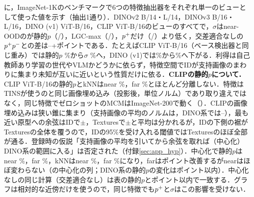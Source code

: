 に，ImageNet-1Kのベンチマークで6つの特徴抽出器をそれぞれ単一のビューとして使った値を示す（抽出1通り）．DINOv2 B/14・L/14，DINOv3 B/16・L/16，DINO (v1) ViT-B/16，CLIP ViT-B/16の\NViewsN{}ビューのすべてで，$\sigma$はnear-OODの\FPR{}が静的$p$（\NViewsNMainBelowStaticNear{}/\NViewsN{}），LGC-max（\NViewsNMainBelowLgcNear{}/\NViewsN{}），$p^{+}$だけ（\NViewsNMainBelowLpNear{}/\NViewsN{}）より低く，交差適合なしの$p^{+}p^{-}$との差は\NViewsMinMainMinusVOneNear{}--+\NViewsMaxMainMinusVOneNear{}ポイントである．たとえばCLIP ViT-B/16（ベース検出器と同じ重み）では静的$p$ \NViewClipStaticNearFpr\%から$\sigma$ \NViewClipMainNearFpr\%へ，DINO (v1)では\NViewDinoOneStaticNearFpr\%から\NViewDinoOneMainNearFpr\%へ下がる．利得は自己教師あり学習の世代やVLMかどうかに依らず，特徴空間でIDが支持画像のまわりに集まり未知が互いに近いという性質だけに依る．\textbf{CLIPの静的$p$について．}CLIP ViT-B/16の静的$p$とkNNはnear \NViewClipStaticNearFpr\%，far \NViewClipStaticFarFpr\%とほとんど分離しない．特徴はTINSが使うのと同じ画像埋め込み（投影後，単位ノルム）であり取り違えではなく，同じ特徴でゼロショットのMCMはImageNet-200で動く（）．CLIPの画像埋め込みは狭い錐に集まり（支持画像の平均のノルムは\NViewsSupportMeanNormClip{}，DINO系では\NViewsSupportMeanNormDinoMin{}--\NViewsSupportMeanNormDinoMax{}），最も近い原型への余弦はIDで\NViewClipMaxCosIdMean{}$\pm$\NViewClipMaxCosIdStd{}，Texturesで\NViewClipMaxCosOodMean{}$\pm$\NViewClipMaxCosOodStd{}と平均は分かれるが，IDの下側の裾がTexturesの全体を覆うので，IDの95\%を受け入れる閾値ではTexturesのほぼ全部が通る．登録時の仮説「支持画像の平均を引いてから余弦を取れば（中心化）DINO系の範囲に入る」は否定された（付録\ref{sec:app_hyp}）．中心化で静的$p$はnear \NViewClipStaticcNearFpr\%，far \NViewClipStaticcFarFpr\%，kNNはnear \NViewClipKnncNearFpr\%，far \NViewClipKnncFarFpr\%になり，farは\NViewClipCentredMinusRawFarFprAbs{}ポイント改善するがnearはほぼ変わらない（の中心化の列；DINO系の静的$p$の変化は\NViewsDinoCentredMaxabsFpr{}ポイント以内）．中心化なしの同じ計算（交差適合なし）は表の静的$p$と\NViewsRawVsTableMaxabs{}ポイント以内で一致する．グラフは相対的な近傍だけを使うので，同じ特徴でも$p^{+}$と$\sigma$はこの影響を受けない．
